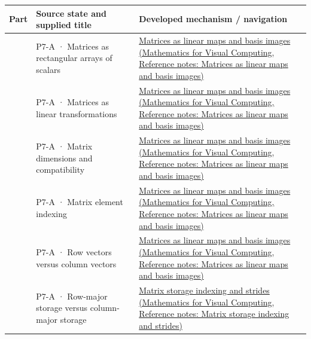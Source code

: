 {\def\LTcaptype{none} %
\begin{longtable}[]{@{}
  >{\raggedright\arraybackslash}p{}
  >{\raggedright\arraybackslash}p{}
  >{\raggedright\arraybackslash}p{}@{}}
\toprule\noalign{}
\begin{minipage}[b]{\linewidth}\raggedright
Part
\end{minipage} & \begin{minipage}[b]{\linewidth}\raggedright
Source state and supplied title
\end{minipage} & \begin{minipage}[b]{\linewidth}\raggedright
Developed mechanism / navigation
\end{minipage} \\
\midrule\noalign{}
\endhead
\bottomrule\noalign{}
\endlastfoot
601 & P7-A · Matrices as rectangular arrays of scalars & \href{../02-Mathematics-for-Visual-Computing/main.pdf\#nameddest=appendix-bd39c3bf5d64}{Matrices as linear maps and basis images (Mathematics for Visual Computing, Reference notes: Matrices as linear maps and basis images)} \\
602 & P7-A · Matrices as linear transformations & \href{../02-Mathematics-for-Visual-Computing/main.pdf\#nameddest=appendix-bd39c3bf5d64}{Matrices as linear maps and basis images (Mathematics for Visual Computing, Reference notes: Matrices as linear maps and basis images)} \\
603 & P7-A · Matrix dimensions and compatibility & \href{../02-Mathematics-for-Visual-Computing/main.pdf\#nameddest=appendix-bd39c3bf5d64}{Matrices as linear maps and basis images (Mathematics for Visual Computing, Reference notes: Matrices as linear maps and basis images)} \\
604 & P7-A · Matrix element indexing & \href{../02-Mathematics-for-Visual-Computing/main.pdf\#nameddest=appendix-bd39c3bf5d64}{Matrices as linear maps and basis images (Mathematics for Visual Computing, Reference notes: Matrices as linear maps and basis images)} \\
605 & P7-A · Row vectors versus column vectors & \href{../02-Mathematics-for-Visual-Computing/main.pdf\#nameddest=appendix-bd39c3bf5d64}{Matrices as linear maps and basis images (Mathematics for Visual Computing, Reference notes: Matrices as linear maps and basis images)} \\
606 & P7-A · Row-major storage versus column-major storage & \href{../02-Mathematics-for-Visual-Computing/main.pdf\#nameddest=appendix-ffdc1d4e5350}{Matrix storage indexing and strides (Mathematics for Visual Computing, Reference notes: Matrix storage indexing and strides)} \\

\end{longtable}}
